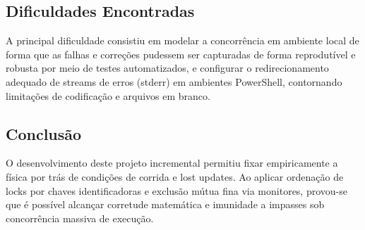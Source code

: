 \documentclass[12pt,a4paper]{article}
\begin{document}
\subsection{Dificuldades Encontradas}
\noindent A principal dificuldade consistiu em modelar a concorrência em ambiente local de forma que as falhas e correções pudessem ser capturadas de forma reprodutível e robusta por meio de testes automatizados, e configurar o redirecionamento adequado de streams de erros (stderr) em ambientes PowerShell, contornando limitações de codificação e arquivos em branco.

\subsection{Conclusão}
\noindent O desenvolvimento deste projeto incremental permitiu fixar empiricamente a física por trás de condições de corrida e lost updates. Ao aplicar ordenação de locks por chaves identificadoras e exclusão mútua fina via monitores, provou-se que é possível alcançar corretude matemática e imunidade a impasses sob concorrência massiva de execução.
\end{document}
